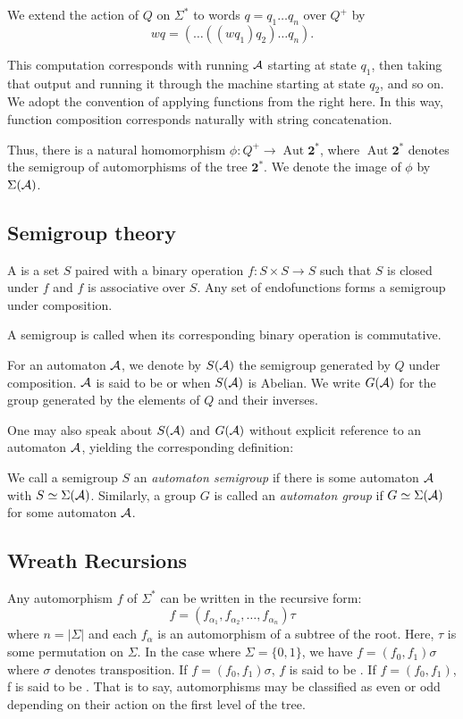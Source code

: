 \documentclass[11pt, titlepage]{article}
\begin{document}
We extend the action of $Q$ on $\Sigma^*$ to words $q = q_1\ldots q_n$
over $Q^+$ by \[ wq = (\ldots((w q_1) q_2)\ldots q_n). \]

This computation corresponds with running $\mathcal{A}$ starting at state $q_1$,
then taking that output and running it through the machine starting at
state $q_2$, and so on. We adopt the convention of applying functions
from the right here. In this way, function composition corresponds
naturally with string concatenation.

Thus, there is a natural homomorphism
$\phi : Q^+ \rightarrow \operatorname{Aut}\textbf{2}^*$, where
$\operatorname{Aut}\textbf{2}^*$ denotes the semigroup of automorphisms of the
tree $\textbf{2}^*$. We denote the image of $\phi$ by $\Sigma(\mathcal{A})$.

\subsection*{Semigroup theory}

A  is a set $S$ paired with a binary operation
$f : S \times S \rightarrow S$ such that $S$ is closed under $f$ and
$f$ is associative over $S$. Any set of endofunctions forms a
semigroup under composition.

A semigroup is called  when its corresponding binary
operation is commutative.

For an automaton $\mathcal{A}$, we denote by $S(\mathcal{A})$ the semigroup generated by
$Q$ under composition. $\mathcal{A}$ is said to be  or
 when $S(\mathcal{A})$ is Abelian. We write $G(\mathcal{A})$ for the group
generated by the elements of $Q$ and their inverses.

One may also speak about $S(\mathcal{A})$ and $G(\mathcal{A})$ without explicit reference
to an automaton $\mathcal{A}$, yielding the corresponding definition:
\begin{definition}
  We call a semigroup $S$ an \emph{automaton semigroup} if there is
  some automaton $\mathcal{A}$ with $S \simeq \Sigma(\mathcal{A})$. Similarly, a group
  $G$ is called an \emph{automaton group} if $G \simeq \Sigma(\mathcal{A})$ for
  some automaton $\mathcal{A}$.
\end{definition}

\subsection*{Wreath Recursions}
Any automorphism $f$ of $\Sigma^*$ can be written in the recursive form:
\[ f = (f_{\alpha_1}, f_{\alpha_2}, \ldots, f_{\alpha_n})\tau \] where
$n = |\Sigma|$ and each $f_\alpha$ is an automorphism of a subtree of
the root. Here, $\tau$ is some permutation on $\Sigma$. In the case
where $\Sigma = \{0, 1\}$, we have $f = (f_0, f_1)\sigma$ where
$\sigma$ denotes transposition. If $f = (f_0, f_1)\sigma$, $f$ is said
to be . If $f = (f_0, f_1)$, f is said to be
. That is to say, automorphisms may be classified as even
or odd depending on their action on the first level of the tree.
\end{document}
